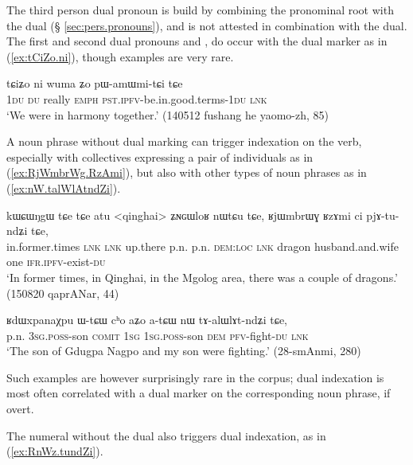 The third person dual pronoun  is build by combining the pronominal root  with the dual  (§ \ref{sec:pers.pronouns}), and is not attested in combination with the dual. The first and second dual pronouns  and , do occur with the dual marker as in (\ref{ex:tCiZo.ni}), though examples are very rare.

\begin{exe}
\ex \label{ex:tCiZo.ni}
\gll  tɕiʑo ni wuma ʑo pɯ-amɯmi-tɕi tɕe \\
\textsc{1du} \textsc{du} really \textsc{emph} \textsc{pst}.\textsc{ipfv}-be.in.good.terms-\textsc{1du} \textsc{lnk} \\
\glt `We were in harmony together.' (140512 fushang he yaomo-zh, 85)
\end{exe}
A noun phrase without dual marking can trigger indexation on the verb, especially with collectives expressing a pair of individuals as  in (\ref{ex:RjWmbrWg.RzAmi}), but also with other types of noun phrases as in (\ref{ex:nW.talWlAtndZi}).

\begin{exe}
\ex \label{ex:RjWmbrWg.RzAmi}
\gll  kɯɕɯŋgɯ tɕe tɕe atu <qinghai> ʑɴɢɯloʁ nɯtɕu tɕe, ʁjɯmbrɯɣ ʁzɤmi ci pjɤ-tu-ndʑi tɕe,  \\
in.former.times \textsc{lnk}  \textsc{lnk} up.there p.n. p.n. \textsc{dem}:\textsc{loc} \textsc{lnk} dragon husband.and.wife one \textsc{ifr}.\textsc{ipfv}-exist-\textsc{du} \\
\glt `In former times, in Qinghai, in the Mgolog area, there was a couple of dragons.' (150820 qaprANar, 44)
\end{exe}

\begin{exe}
\ex \label{ex:nW.talWlAtndZi}
\gll  ʁdɯxpanaχpu ɯ-tɕɯ cʰo aʑo a-tɕɯ nɯ tɤ-alɯlɤt-ndʑi tɕe, \\
p.n. \textsc{3sg}.\textsc{poss}-son \textsc{comit} \textsc{1sg} \textsc{1sg}.\textsc{poss}-son \textsc{dem} \textsc{pfv}-fight-\textsc{du} \textsc{lnk} \\
\glt `The son of Gdugpa Nagpo and my son were fighting.' (28-smAnmi, 280)
\end{exe}

Such examples are however surprisingly rare in the corpus; dual indexation is most often correlated with a dual marker on the corresponding noun phrase, if overt.

The numeral  without the dual also triggers dual indexation, as in (\ref{ex:RnWz.tundZi}).

